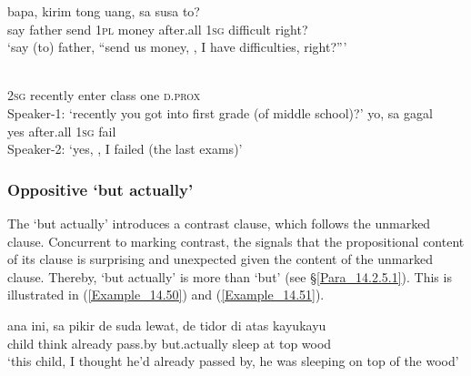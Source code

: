 \ea\label{Example_14.48}
 {bapa,} {kirim} {tong} {uang,} {} {sa} {susa} {to?}\\ %
 say  father  send  \textsc{1pl}  money  after.all  \textsc{1sg}  difficult  right?\\
\glt ‘say (to) father, ``send us money, , I have difficulties, right?''' \textstyleExampleSource{[080922-001a-CvPh.0866]}
\z

\ea\label{Example_14.49}
\ea{}\\ %
   {}  \textsc{2sg}  recently  enter  class  one  \textsc{d.prox}\\
\glt Speaker-1: ‘recently you got into first grade (of middle school)?’
\vspace{10pt}
\ex
{}  yo,    sa  gagal\\
  {}   yes  after.all  \textsc{1sg}  fail\\
\glt Speaker-2: ‘yes, , I failed (the last exams)’ \textstyleExampleSource{[080922-001a-CvPh.0965-0966]}
\z
\z

\subsubsection[Oppositive padahal ‘but actually’]{Oppositive  ‘but actually’}
\label{Para_14.2.5.3}
The   ‘but actually’ introduces a contrast clause, which follows the unmarked clause. Concurrent to marking contrast, the  signals that the propositional content of its clause is surprising and unexpected given the content of the unmarked clause. Thereby,  ‘but actually’ is more  than  ‘but’ (see §\ref{Para_14.2.5.1}). This is illustrated in (\ref{Example_14.50}) and (\ref{Example_14.51}).
%

\ea
\label{Example_14.50}
\gll ana  ini,  sa  pikir  de  suda  lewat,    de tidor  di  atas  kayu{\Tilde}kayu\\  
child      think    already  pass.by  but.actually   sleep  at  top  wood\\
\glt ‘this child, I thought he’d already passed by,  he was sleeping on top of the wood’ \textstyleExampleSource{[081013-004.Cv.0004]}
\z


